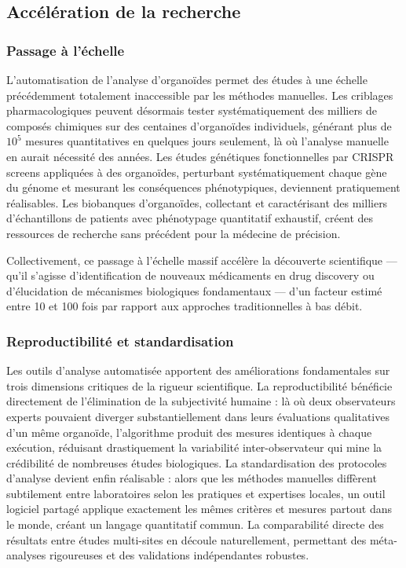 \subsection{Accélération de la recherche}

\subsubsection{Passage à l'échelle}

L'automatisation de l'analyse d'organoïdes permet des études à une échelle précédemment totalement inaccessible par les méthodes manuelles. Les criblages pharmacologiques peuvent désormais tester systématiquement des milliers de composés chimiques sur des centaines d'organoïdes individuels, générant plus de $10^5$ mesures quantitatives en quelques jours seulement, là où l'analyse manuelle en aurait nécessité des années. Les études génétiques fonctionnelles par CRISPR screens appliquées à des organoïdes, perturbant systématiquement chaque gène du génome et mesurant les conséquences phénotypiques, deviennent pratiquement réalisables. Les biobanques d'organoïdes, collectant et caractérisant des milliers d'échantillons de patients avec phénotypage quantitatif exhaustif, créent des ressources de recherche sans précédent pour la médecine de précision.

Collectivement, ce passage à l'échelle massif accélère la découverte scientifique — qu'il s'agisse d'identification de nouveaux médicaments en drug discovery ou d'élucidation de mécanismes biologiques fondamentaux — d'un facteur estimé entre 10 et 100 fois par rapport aux approches traditionnelles à bas débit.

\subsubsection{Reproductibilité et standardisation}

Les outils d'analyse automatisée apportent des améliorations fondamentales sur trois dimensions critiques de la rigueur scientifique. La reproductibilité bénéficie directement de l'élimination de la subjectivité humaine : là où deux observateurs experts pouvaient diverger substantiellement dans leurs évaluations qualitatives d'un même organoïde, l'algorithme produit des mesures identiques à chaque exécution, réduisant drastiquement la variabilité inter-observateur qui mine la crédibilité de nombreuses études biologiques. La standardisation des protocoles d'analyse devient enfin réalisable : alors que les méthodes manuelles diffèrent subtilement entre laboratoires selon les pratiques et expertises locales, un outil logiciel partagé applique exactement les mêmes critères et mesures partout dans le monde, créant un langage quantitatif commun. La comparabilité directe des résultats entre études multi-sites en découle naturellement, permettant des méta-analyses rigoureuses et des validations indépendantes robustes.

